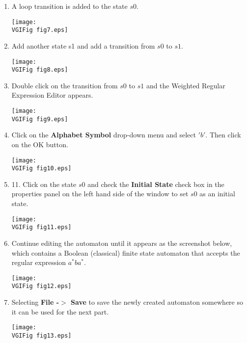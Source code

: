 \begin{enumerate}
\item A loop transition is added to the state $s0$.
\begin{center}
\texttt{[image: \\VGIFig fig7.eps]}
\end{center}

\item   Add another state s1 and add a transition from $s0$ to $s1$.
\begin{center}
\texttt{[image: \\VGIFig fig8.eps]}
\end{center}

\item   Double click on the transition from $s0$ to $s1$ and the Weighted Regular Expression Editor appears.
\begin{center}
\texttt{[image: \\VGIFig fig9.eps]}
\end{center}

\item  Click on the {\bf Alphabet Symbol} drop-down menu and select $'b'$.  Then click on the OK button.
\begin{center}
\texttt{[image: \\VGIFig fig10.eps]}
\end{center}

\item 11. Click on the state $s0$ and check the {\bf Initial State}
 check box in the properties panel on the left hand side of the window to set $s0$ as an initial state.
\begin{center}
\texttt{[image: \\VGIFig fig11.eps]}
\end{center}

\item  Continue editing the automaton until it appears as the screenshot below,
which contains a Boolean (classical) finite state automaton that
accepts the regular expression $a^*ba^*$.
\begin{center}
\texttt{[image: \\VGIFig fig12.eps]}
\end{center}

\item  Selecting {\bf File -$>$ Save} to save the newly created automaton
somewhere so it can be used for the next part.
\begin{center}
\texttt{[image: \\VGIFig fig13.eps]}
\end{center}
\end{enumerate}


% 
% 
